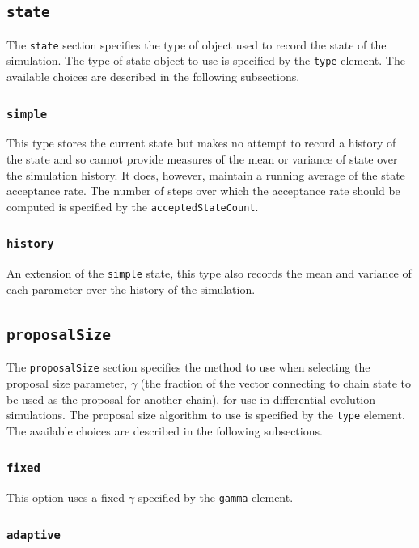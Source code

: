 \subsection{{\tt state}}

The {\tt state} section specifies the type of object used to record the state of the simulation. The type of state object to use is specified by the {\tt type} element. The available choices are described in the following subsections.

\subsubsection{{\tt simple}}

This type stores the current state but makes no attempt to record a history of the state and so cannot provide measures of the mean or variance of state over the simulation history. It does, however, maintain a running average of the state acceptance rate. The number of steps over which the acceptance rate should be computed is specified by the {\tt acceptedStateCount}.

\subsubsection{{\tt history}}

An extension of the {\tt simple} state, this type also records the mean and variance of each parameter over the history of the simulation.

\subsection{{\tt proposalSize}}

The {\tt proposalSize} section specifies the method to use when selecting the proposal size parameter, $\gamma$ (the fraction of the vector connecting to chain state to be used as the proposal for another chain), for use in differential evolution simulations. The proposal size algorithm to use is specified by the {\tt type} element. The available choices are described in the following subsections.

\subsubsection{{\tt fixed}}

This option uses a fixed $\gamma$ specified by the {\tt gamma} element.

\subsubsection{{\tt adaptive}}

